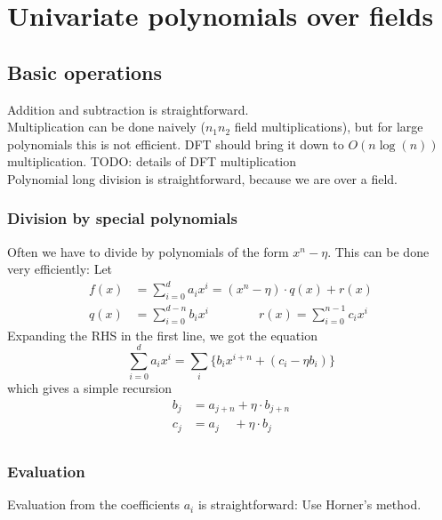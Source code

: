 \documentclass[12pt,draft,a4paper,openany,oneside]{amsbook}
\theoremstyle{plain}
\theoremstyle{definition}
\begin{document}

\chapter{Univariate polynomials over fields}

\section{Basic operations}

Addition and subtraction is straightforward.\\

Multiplication can be done naively ($n_1n_2$ field multiplications), but for 
large polynomials this is not efficient. DFT should bring it down to $O(n\log(n))$
multiplication. TODO: details of DFT multiplication\\

Polynomial long division is straightforward, because we are over a field.

\subsection*{Division by special polynomials}
Often we have to divide by polynomials of the form $x^n-\eta$. This can be
done very efficiently: Let
\begin{align*} 
f(x) &= \sum_{i=0}^d     a_ix^i = (x^n-\eta)\cdot q(x) + r(x) \\
q(x) &= \sum_{i=0}^{d-n} b_ix^i \quad\quad\quad\quad
r(x)  = \sum_{i=0}^{n-1} c_ix^i 
\end{align*}
Expanding the RHS in the first line, we got the equation
\[ \sum_{i=0}^d a_ix^i = \sum_i \big\{ b_ix^{i+n} + (c_i - \eta b_i) \big\} \]
which gives a simple recursion
\begin{align*}
b_j &= a_{j+n}        + \eta \cdot b_{j+n} \\
c_j &= a_{j} \;\;\;\; + \eta \cdot b_{j} \\
\end{align*}

\subsection*{Evaluation}

Evaluation from the coefficients $a_i$ is straightforward: Use Horner's method.\\
\end{document}
